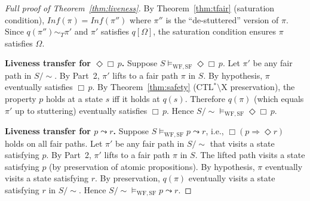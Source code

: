 \documentclass[11pt]{article}
\newcommand{\WF}{\ensuremath{\mathrm{WF}}}
\newcommand{\SF}{\ensuremath{\mathrm{SF}}}
\begin{document}
\begin{proof}[Full proof of Theorem~\ref{thm:liveness}]
By Theorem~\ref{thm:tfair} (saturation condition),
$\mathit{Inf}(\pi) = \mathit{Inf}(\pi'')$ where $\pi''$ is the
``de-stuttered'' version of $\pi$.
Since $q(\pi'') \sim_T \pi'$ and $\pi'$ satisfies $q[\Omega]$,
the saturation condition ensures $\pi$ satisfies $\Omega$.

\textbf{Liveness transfer for $\Diamond\Box\,p$.}
Suppose $S \models_{\WF,\SF} \Diamond\Box\,p$.
Let $\pi'$ be any fair path in $S/{\sim}$.
By Part~2, $\pi'$ lifts to a fair path $\pi$ in $S$.
By hypothesis, $\pi$ eventually satisfies $\Box\,p$.
By Theorem~\ref{thm:safety} (CTL$^*$$\setminus$X preservation), the
property $p$ holds at a state $s$ iff it holds at $q(s)$.
Therefore $q(\pi)$ (which equals $\pi'$ up to stuttering) eventually
satisfies $\Box\,p$.
Hence $S/{\sim} \models_{\WF,\SF} \Diamond\Box\,p$.

\textbf{Liveness transfer for $p \leadsto r$.}
Suppose $S \models_{\WF,\SF} p \leadsto r$, i.e.,
$\Box(p \Rightarrow \Diamond r)$ holds on all fair paths.
Let $\pi'$ be any fair path in $S/{\sim}$ that visits a state satisfying $p$.
By Part~2, $\pi'$ lifts to a fair path $\pi$ in $S$.
The lifted path visits a state satisfying $p$ (by preservation of atomic
propositions).
By hypothesis, $\pi$ eventually visits a state satisfying $r$.
By preservation, $q(\pi)$ eventually visits a state satisfying $r$ in
$S/{\sim}$.
Hence $S/{\sim} \models_{\WF,\SF} p \leadsto r$.
\end{proof}

\end{document}
